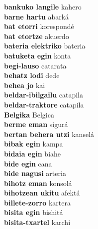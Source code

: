 \textbf{ bankuko langile  } kahero \\
\textbf{ barne hartu  } abarká \\
\textbf{ bat etorri  } korespondé \\
\textbf{ bat etortze  } akuerdo \\
\textbf{ bateria elektriko  } bateria \\
\textbf{ batuketa egin  } konta \\
\textbf{ begi-lauso  } catarata \\
\textbf{ behatz lodi  } dede \\
\textbf{ behea jo  } kai \\
\textbf{ beldar-ibilgailu  } catapila \\
\textbf{ beldar-traktore  } catapila \\
\textbf{ Belgika  } Belgica \\
\textbf{ berme eman  } sigurá \\
\textbf{ bertan behera utzi  } kanselá \\
\textbf{ bibak egin  } kampa \\
\textbf{ bidaia egin  } biahe \\
\textbf{ bide egin  } cana \\
\textbf{ bide nagusi  } arteria \\
\textbf{ bihotz eman  } konsolá \\
\textbf{ bihotzean ukitu  } afektá \\
\textbf{ billete-zorro  } kartera \\
\textbf{ bisita egin  } bishitá \\
\textbf{ bisita-txartel  } karchi \\
